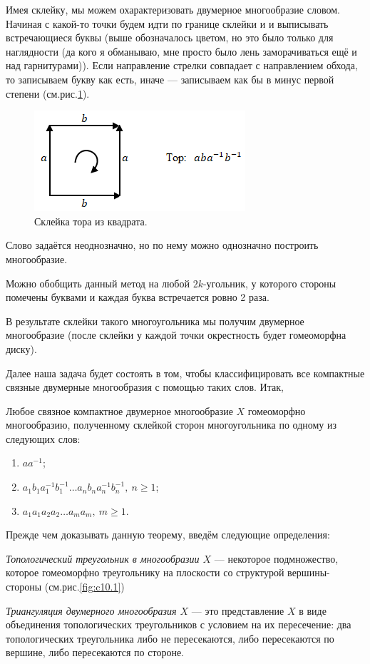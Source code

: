 Имея склейку, мы можем охарактеризовать двумерное многообразие словом. Начиная с какой-то точки будем идти по границе склейки и и выписывать встречающиеся буквы (выше обозначалось цветом, но это было только для наглядности (да кого я обманываю, мне просто было лень заморачиваться ещё и над гарнитурами)). Если направление стрелки совпадает с направлением обхода, то записываем букву как есть, иначе — записываем как бы в минус первой степени (см.рис.\ref{fig:c10.2}).

\begin{figure}[H]
    \centering
    \includegraphics[scale=1]{images/c10.2.png}
    \caption{Склейка тора из квадрата.}
    \label{fig:c10.2}
\end{figure}

Слово задаётся неоднозначно, но по нему можно однозначно построить многообразие.

Можно обобщить данный метод на любой $2k$-угольник, у которого стороны помечены буквами и каждая буква встречается ровно 2 раза.

В результате склейки такого многоугольника мы получим двумерное многообразие (после склейки у каждой точки окрестность будет гомеоморфна диску).

Далее наша задача будет состоять в том, чтобы классифицировать все компактные связные двумерные многообразия с помощью таких слов. Итак,

\begin{theorem}
    Любое связное компактное двумерное многообразие $X$ гомеоморфно многообразию, полученному склейкой сторон многоугольника по одному из следующих слов:
    \begin{enumerate}
        \item $aa^{-1}$;
        \item $a_1b_1a_1^{-1}b_1^{-1}\dots a_n b_n a_n^{-1} b_n^{-1}, \ n \geqslant 1$;
        \item $a_1 a_1 a_2 a_2 \dots a_m a_m, \ m \geqslant 1$.
    \end{enumerate}
\end{theorem} 
Прежде чем доказывать данную теорему, введём следующие определения:
\begin{definition}
    \textit{Топологический треугольник в многообразии $X$} — некоторое подмножество, которое гомеоморфно треугольнику на плоскости со структурой вершины-стороны (см.рис.\ref{fig:c10.1})
\end{definition} 
\begin{definition}
    \textit{Триангуляция двумерного многообразия $X$} — это представление $X$ в виде объединения топологических треугольников с условием на их пересечение: два топологических треугольника либо не пересекаются, либо пересекаются по вершине, либо пересекаются по стороне.
\end{definition} 

